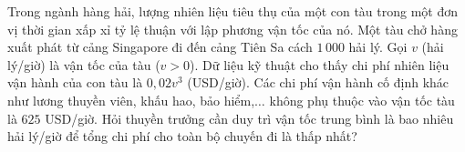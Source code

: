 \begin{ex}%
Trong ngành hàng hải, lượng nhiên liệu tiêu thụ của một con tàu trong một đơn vị thời gian xấp xỉ tỷ lệ thuận với lập phương vận tốc của nó. Một tàu chở hàng xuất phát từ cảng Singapore đi đến cảng Tiên Sa cách $1\,000$ hải lý. Gọi $v$ (hải lý/giờ) là vận tốc của tàu ($v>0$). Dữ liệu kỹ thuật cho thấy chi phí nhiên liệu vận hành của con tàu là $0{,}02v^3$ (USD/giờ). Các chi phí vận hành cố định khác như lương thuyền viên, khấu hao, bảo hiểm,$\ldots$ không phụ thuộc vào vận tốc tàu là $625$ USD/giờ. Hỏi thuyền trưởng cần duy trì vận tốc trung bình là bao nhiêu hải lý/giờ để tổng chi phí cho toàn bộ chuyến đi là thấp nhất?
\end{ex}

